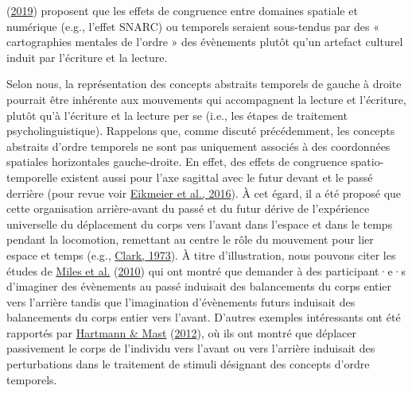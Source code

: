 \documentclass[
  a4paper,12pt,twoside,onecolumn,openright,final,oldfontcommands]{memoir}
\begin{document}
(\protect\hyperlink{ref-casasanto_faulty_2019}{2019}) proposent que les effets de congruence entre domaines spatiale et numérique (e.g., l'effet SNARC) ou temporels seraient sous-tendus par des « cartographies mentales de l'ordre » des évènements plutôt qu'un artefact culturel induit par l'écriture et la lecture.

Selon nous, la représentation des concepts abstraits temporels de gauche à droite pourrait être inhérente aux mouvements qui accompagnent la lecture et l'écriture, plutôt qu'à l'écriture et la lecture per se (i.e., les étapes de traitement psycholinguistique). Rappelons que, comme discuté précédemment, les concepts abstraits d'ordre temporels ne sont pas uniquement associés à des coordonnées spatiales horizontales gauche-droite. En effet, des effets de congruence spatio-temporelle existent aussi pour l'axe sagittal avec le futur devant et le passé derrière (pour revue voir \protect\hyperlink{ref-lewandowska-tomaszczyk_mental_2016}{Eikmeier et al., 2016}). À cet égard, il a été proposé que cette organisation arrière-avant du passé et du futur dérive de l'expérience universelle du déplacement du corps vers l'avant dans l'espace et dans le temps pendant la locomotion, remettant au centre le rôle du mouvement pour lier espace et temps (e.g., \protect\hyperlink{ref-clark_space_1973}{Clark, 1973}). À titre d'illustration, nous pouvons citer les études de \protect\hyperlink{ref-miles_mapping_2010}{Miles et al.} (\protect\hyperlink{ref-miles_mapping_2010}{2010}) qui ont montré que demander à des participant·e·s d'imaginer des évènements au passé induisait des balancements du corps entier vers l'arrière tandis que l'imagination d'évènements futurs induisait des balancements du corps entier vers l'avant. D'autres exemples intéressants ont été rapportés par \protect\hyperlink{ref-hartmann_moving_2012-1}{Hartmann \& Mast} (\protect\hyperlink{ref-hartmann_moving_2012-1}{2012}), où ils ont montré que déplacer passivement le corps de l'individu vers l'avant ou vers l'arrière induisait des perturbations dans le traitement de stimuli désignant des concepts d'ordre temporels.
\end{document}
